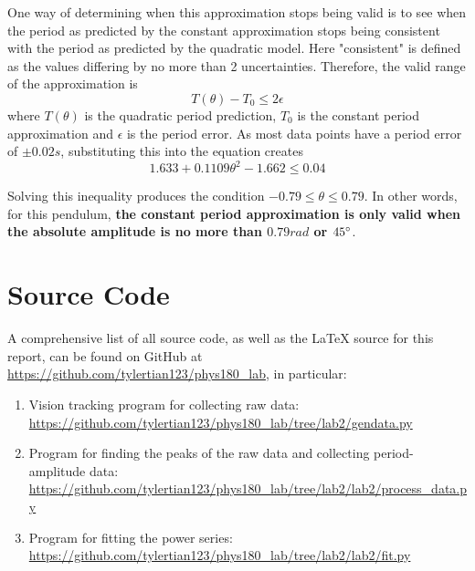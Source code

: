 \documentclass[aps,twocolumn,secnumarabic,nobalancelastpage,amsmath,amssymb,nofootinbib,floatfix]{revtex4}
\begin{document}
One way of determining when this approximation stops being valid is to see when the period as predicted by the constant
approximation stops being consistent with the period as predicted by the quadratic model. Here "consistent" is defined
as the values differing by no more than 2 uncertainties. Therefore, the valid range of the approximation is
\begin{equation}
    T(\theta) - T_0 \leq 2\epsilon
\end{equation}
where $T(\theta)$ is the quadratic period prediction, $T_0$ is the constant period approximation and $\epsilon$ is the
period error. As most data points have a period error of $\pm 0.02\si{s}$, substituting this into the equation creates
\begin{equation}
    1.633 + 0.1109\theta^2 - 1.662 \leq 0.04
\end{equation}

Solving this inequality produces the condition $-0.79 \leq \theta \leq 0.79$. In other words, for this pendulum,
\textbf{the constant period approximation is only valid when the absolute amplitude is no more than $0.79\si{rad}$ or
$45\degree$}.


\appendix

\section{Source Code}

A comprehensive list of all source code, as well as the \LaTeX{} source for this report, can be found on GitHub at
\url{https://github.com/tylertian123/phys180_lab}, in particular:
\label{appendix:code}
\begin{enumerate}
    \item Vision tracking program for collecting raw data: \url{https://github.com/tylertian123/phys180_lab/tree/lab2/gendata.py}
    \item Program for finding the peaks of the raw data and collecting period-amplitude data: \url{https://github.com/tylertian123/phys180_lab/tree/lab2/lab2/process_data.py}
    \item Program for fitting the power series: \url{https://github.com/tylertian123/phys180_lab/tree/lab2/lab2/fit.py}
\end{enumerate}
\end{document}
